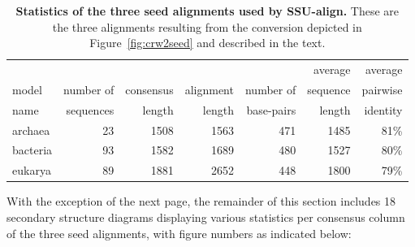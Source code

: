 \begin{table}
\begin{center}
\begin{tabular}{lrrrrrr} \hline
        &           &           &           &           & average   & average  \\
model   & number of & consensus & alignment & number of & sequence  & pairwise \\
name    & sequences & length    & length    & base-pairs & length    & identity \\ \hline
archaea & 23        & 1508      & 1563      & 471       & 1485      & 81\%     \\
bacteria& 93        & 1582      & 1689      & 480       & 1527      & 80\%     \\
eukarya  & 89       & 1881      & 2652      & 448       & 1800      & 79\%     \\ 
\end{tabular}
\caption[Statistics of the three seed alignments used by SSU-align.]
{\textbf{Statistics of the three seed alignments used by
    SSU-align.} These are the three alignments resulting from the
     conversion depicted in Figure~\ref{fig:crw2seed} and
    described in the text.}
\label{tbl:finalseeds}
\end{center}
\end{table}

With the exception of the next page, the remainder of this section
includes 18 secondary structure diagrams displaying various statistics
per consensus column of the three seed alignments, with figure numbers
as indicated below:

\vspace{0.2in}

